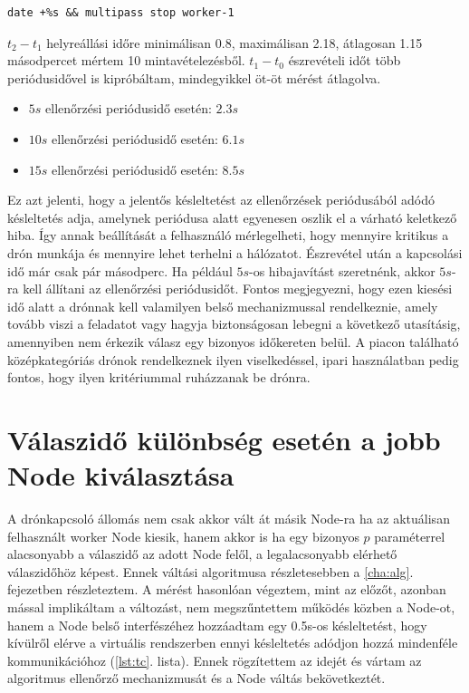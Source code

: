 \begin{lstlisting}[caption={Node kikapcsolása}, label={lst:close}]
date +%s && multipass stop worker-1
\end{lstlisting}

\noindent
$t_2-t_1$ helyreállási időre minimálisan 0.8, maximálisan 2.18, átlagosan 1.15 másodpercet mértem 10 mintavételezésből. $t_1-t_0$ észrevételi időt több periódusidővel is kipróbáltam, mindegyikkel öt-öt mérést átlagolva.
\begin{itemize}
	\item $5s$ ellenőrzési periódusidő esetén: $2.3s$
	\item $10s$ ellenőrzési periódusidő esetén: $6.1s$
	\item $15s$ ellenőrzési periódusidő esetén: $8.5s$
\end{itemize}

\noindent
Ez azt jelenti, hogy a jelentős késleltetést az ellenőrzések periódusából adódó késleltetés adja, amelynek periódusa alatt egyenesen oszlik el a várható keletkező hiba. Így annak beállítását a felhasználó mérlegelheti, hogy mennyire kritikus a drón munkája és mennyire lehet terhelni a hálózatot. Észrevétel után a kapcsolási idő már csak pár másodperc. Ha például $5s$-os hibajavítást szeretnénk, akkor $5s$-ra kell állítani az ellenőrzési periódusidőt. Fontos megjegyezni, hogy ezen kiesési idő alatt a drónnak kell valamilyen belső mechanizmussal rendelkeznie, amely tovább viszi a feladatot vagy hagyja biztonságosan lebegni a következő utasításig, amennyiben nem érkezik válasz egy bizonyos időkereten belül. A piacon található középkategóriás drónok rendelkeznek ilyen viselkedéssel, ipari használatban pedig fontos, hogy ilyen kritériummal ruházzanak be drónra.

\section{Válaszidő különbség esetén a jobb Node kiválasztása}
A drónkapcsoló állomás nem csak akkor vált át másik Node-ra ha az aktuálisan felhasznált worker Node kiesik, hanem akkor is ha egy bizonyos $p$ paraméterrel alacsonyabb a válaszidő az adott Node felől, a legalacsonyabb elérhető válaszidőhöz képest. Ennek váltási algoritmusa részletesebben a \ref{cha:alg}. fejezetben részleteztem. A mérést hasonlóan végeztem, mint az előzőt, azonban mással implikáltam a változást, nem megszűntettem működés közben a Node-ot, hanem a Node belső interfészéhez hozzáadtam egy 0.5s-os késleltetést, hogy kívülről elérve a virtuális rendszerben ennyi késleltetés adódjon hozzá mindenféle kommunikációhoz (\ref{lst:tc}. lista). Ennek rögzítettem az idejét és vártam az algoritmus ellenőrző mechanizmusát és a Node váltás bekövetkeztét.

